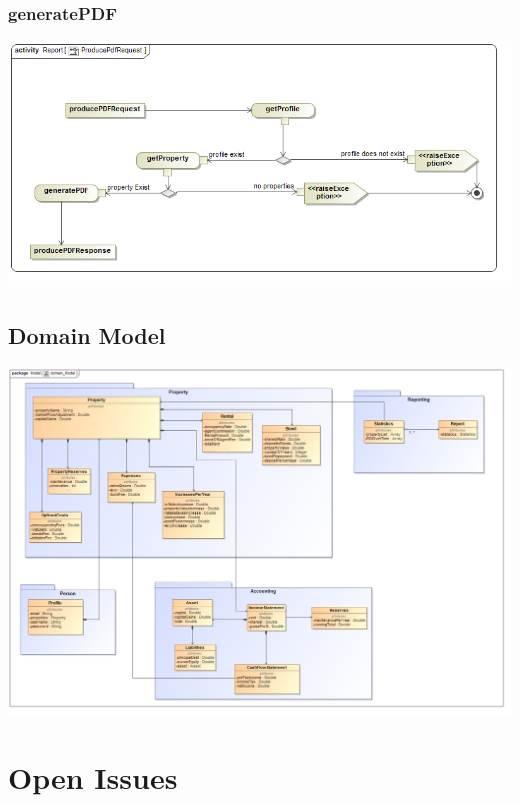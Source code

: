 \documentclass[a4paper,12pt]{article}
\begin{document}
\subsubsection{generatePDF}
\includegraphics[width=1\textwidth]{./Images/newDiagrams/processSpecification/Sandile/ProducePdfRequest.png}

\subsection{Domain Model}
\includegraphics[width=1\textwidth]{./domainModel/domain_Model.PNG}


\newpage
\section{Open Issues}
\end{document}
